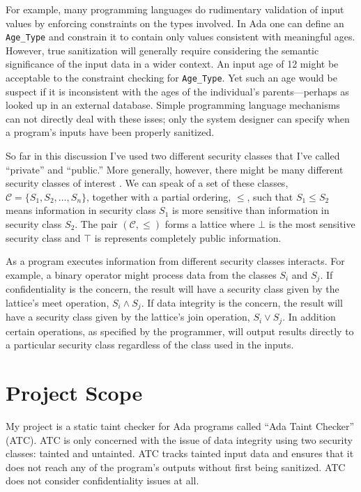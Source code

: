 \documentclass{article}
\begin{document}
For example, many programming languages do rudimentary validation of input values by enforcing constraints on the types involved. In Ada one can define an \texttt{Age\_Type} and constrain it to contain only values consistent with meaningful ages. However, true sanitization will generally require considering the semantic significance of the input data in a wider context. An input age of 12 might be acceptable to the constraint checking for \texttt{Age\_Type}. Yet such an age would be suspect if it is inconsistent with the ages of the individual's parents---perhaps as looked up in an external database. Simple programming language mechanisms can not directly deal with these isses; only the system designer can specify when a program's inputs have been properly sanitized.

So far in this discussion I've used two different security classes that I've called ``private'' and ``public.'' More generally, however, there might be many different security classes of interest \cite{Denning:1976-05}. We can speak of a set of these classes, $\mathcal{C} = \{ S_1, S_2, \ldots, S_n\}$, together with a partial ordering, $\le$, such that $S_1 \le S_2$ means information in security class $S_1$ is more sensitive than information in security class $S_2$. The pair $(\mathcal{C}, \le)$ forms a lattice where $\bot$ is the most sensitive security class and $\top$ is represents completely public information.

As a program executes information from different security classes interacts. For example, a binary operator might process data from the classes $S_i$ and $S_j$. If confidentiality is the concern, the result will have a security class given by the lattice's meet operation, $S_i \wedge S_j$. If data integrity is the concern, the result will have a security class given by the lattice's join operation, $S_i \vee S_j$. In addition certain operations, as specified by the programmer, will output results directly to a particular security class regardless of the class used in the inputs.

\section{Project Scope}

My project is a static taint checker for Ada programs called ``Ada Taint Checker'' (ATC). ATC is only concerned with the issue of data integrity using two security classes: tainted and untainted. ATC tracks tainted input data and ensures that it does not reach any of the program's outputs without first being sanitized. ATC does not consider confidentiality issues at all.
\end{document}
